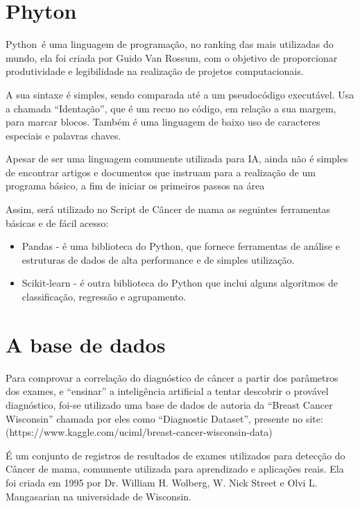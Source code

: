 \section{\textbf{Phyton}}

Python é uma linguagem de programação, no ranking das mais utilizadas do mundo, ela foi criada por Guido Van Rossum, com o objetivo de proporcionar produtividade e legibilidade na realização de projetos computacionais. \cite{PYTHON}

A sua sintaxe é simples, sendo comparada até a um pseudocódigo executável. Usa a chamada “Identação”, que é um recuo no código, em relação a sua margem, para marcar blocos. Também é uma linguagem de baixo uso de caracteres especiais e palavras chaves. 

Apesar de ser uma linguagem comumente utilizada para IA, ainda não é simples de encontrar artigos e documentos que instruam para a realização de um programa básico, a fim de iniciar os primeiros passos na área

Assim, será utilizado no Script de Câncer de mama as seguintes ferramentas básicas e de fácil acesso:

\begin{itemize}
\item Pandas - é uma biblioteca do Python, que fornece ferramentas de análise e estruturas de dados de alta performance e de simples utilização.\cite{PANDAS}
\item Scikit-learn - é outra biblioteca do Python que inclui alguns algoritmos de classificação, regressão e agrupamento.\cite{SCIKIT}
\end{itemize}

\section{\textbf{A base de dados}}

Para comprovar a correlação do diagnóstico de câncer a partir dos parâmetros dos exames, e “ensinar” a inteligência artificial a tentar descobrir o provável diagnóstico, foi-se utilizado uma base de dados de autoria da “Breast Cancer Wisconsin” chamada por eles como “Diagnostic Dataset”, presente no site: (https://www.kaggle.com/uciml/breast-cancer-wisconsin-data)\cite{BREASTCANCER}

É um conjunto de registros de resultados de exames utilizados para detecção do Câncer de mama, comumente utilizada para aprendizado e aplicações reais. Ela foi criada em 1995 por Dr. William H. Wolberg, W. Nick Street e Olvi L. Mangasarian na universidade de Wisconsin. 

